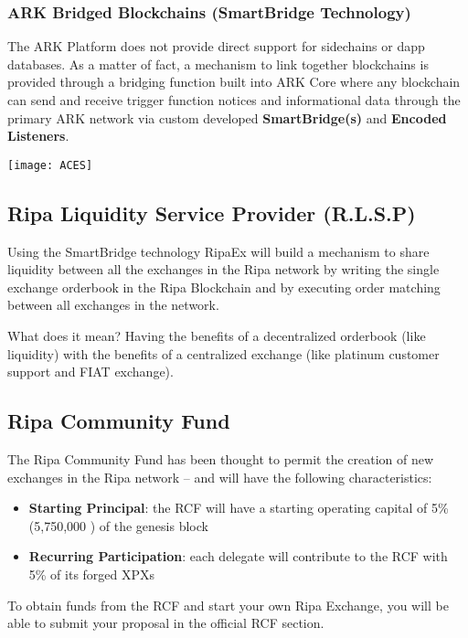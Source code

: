 \documentclass[11pt,fleqn,oneside]{book} %
\begin{document}
\subsubsection{ARK Bridged Blockchains (SmartBridge Technology)}
The ARK Platform does not provide direct support for sidechains or dapp databases.
As a matter of fact, a mechanism to link together blockchains is provided through a bridging function built into ARK Core
where any blockchain can send and receive trigger function notices and informational data through the primary ARK network via
custom developed \textbf{SmartBridge(s)} and \textbf{Encoded Listeners}.
\begin{center}
	\texttt{[image: ACES]}
\end{center}

\subsection{Ripa Liquidity Service Provider (R.L.S.P)}
Using the SmartBridge technology RipaEx will build a mechanism to share liquidity between all the exchanges in the Ripa network
by writing the single exchange orderbook in the Ripa Blockchain and by executing order matching between all exchanges in the network.

What does it mean? Having the benefits of a decentralized orderbook (like liquidity) with the benefits of a centralized exchange 
(like platinum customer support and FIAT exchange).

\subsection{Ripa Community Fund}
The Ripa Community Fund has been thought to permit the creation of new exchanges in the Ripa network – and will 
have the following characteristics:
\begin{itemize}
	\item \textbf{Starting Principal}: the RCF will have a starting operating capital of 5\% (5,750,000 \PHP) of the genesis block
	\item \textbf{Recurring Participation}: each delegate will contribute to the RCF with 5\% of its forged XPXs
\end{itemize}
\vspace{5mm}
To obtain funds from the RCF and start your own Ripa Exchange, you will be able to submit your proposal in the official RCF section.
\end{document}

